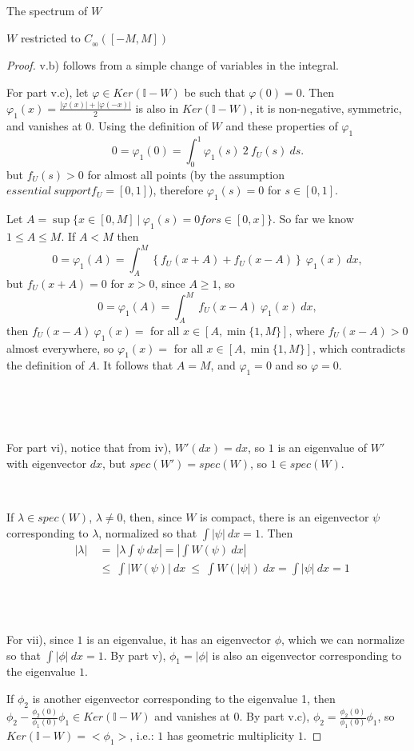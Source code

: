 \documentclass[12pt]{article}
\begin{document}
\begin{section}{The spectrum of $W$ }
\begin{subsection}{$W$ restricted to $C_{_{0\!0}}([-M,M])$}
\begin{proof}
v.b) follows from a simple change of variables in the integral. 

For part v.c), let $\varphi \in Ker(\mathbb{I} - W)$ be such that $\varphi(0)=0$. Then $\varphi_1(x) = \frac{|\varphi(x)| + |\varphi(-x)|}{2}$ is also in  $Ker(\mathbb{I} - W)$, it is non-negative, symmetric, and vanishes at $0$. Using the definition of $W$ and these properties of $\varphi_1$
$$
0 = \varphi_1(0) = \int_{0}^{1} \varphi_1(s)\ 2 \ f_U\!( s) \ ds.
$$
but $f_U(s)>0$ for almost all points (by the assumption $essential \ support f_U = [0,1]$), therefore $\varphi_1(s)=0$ for $s \in [0,1]$.

Let $A=\sup\{ x \in [0,M]\ | \ \varphi_1(s)=0 for s \in [0,x]\}$. So far we know $1 \le A \le M$. If $A < M$ then 
$$
0 = \varphi_1(A) = \int_{A}^M \left\{ f_U(x+A) + f_U(x-A) \right\} \ \varphi_1(x) \ dx, 
$$
but $f_U(x+A)=0$ for $x>0$, since $A \ge 1$, so
$$
0 = \varphi_1(A) = \int_{A}^M \ f_U(x-A) \ \varphi_1(x) \ dx, 
$$
then $f_U(x-A) \ \varphi_1(x) = $ for all $x \in [A, \min\{1,M\}]$, where  $f_U(x-A) > 0$ almost everywhere, so $\varphi_1(x) = $ for all $x \in [A, \min\{1,M\}]$, which contradicts the definition of $A$. It follows that $A=M$, and $\varphi_1 = 0$ and so $\varphi = 0$.

\  

\  

For part vi), notice that from iv), $W'(dx)=dx$, so $1$ is an eigenvalue of $W'$ with eigenvector $dx$, but $spec(W')=spec(W)$, so $1 \in spec(W)$. 
\  

\ 


If $\lambda \in spec(W)$, $\lambda \ne 0$, then, since $W$ is compact, there is an eigenvector $\psi$ corresponding to $\lambda$, normalized so that $\int |\psi| \ dx = 1$. Then
\begin{align*}
&& |\lambda| &~=~ \left| \lambda \int \psi \ dx \right| = \left| \int W(\psi) \ dx \right| &\\
&& &~\le~  \int \left| W(\psi) \right| \ dx  ~\le~ \int W(|\psi|) \ dx = \int |\psi| \ dx = 1 &
\end{align*}
\

\

For vii), since $1$ is an eigenvalue, it has an eigenvector $\phi$, which we can normalize so that $\int |\phi| \ dx = 1$. By part v), $\phi_1 = |\phi|$ is also an eigenvector corresponding to the eigenvalue $1$.

If $\phi_2$ is another eigenvector corresponding to the eigenvalue 1, then $\phi_2 - \frac{\phi_2(0)}{\phi_1(0)} \phi_1 \in Ker(\mathbb{I} - W)$ and vanishes at 0. By part v.c), $\phi_2 = \frac{\phi_2(0)}{\phi_1(0)} \phi_1$, so $Ker(\mathbb{I} - W) = <\phi_1>$, i.e.: $1$ has geometric multiplicity $1$. 


\end{proof}
\end{subsection}
\end{section}
\end{document}
